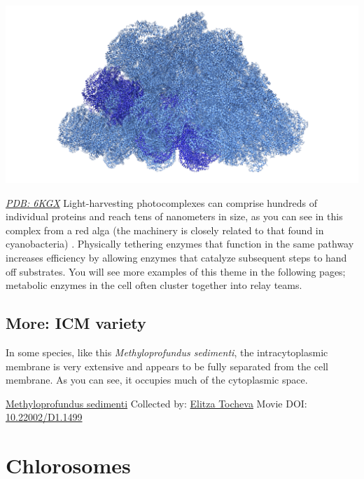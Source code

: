 \documentclass[]{tufte-book}
\begin{document}
\includegraphics{img/schematics/4_3_1}

\href{http://rcsb.org/structure/6KGX}{\emph{PDB: 6KGX}}
Light-harvesting photocomplexes can comprise hundreds of individual proteins and reach tens of nanometers in size, as you can see in this complex from a red alga (the machinery is closely related to that found in cyanobacteria) \citep{ma2020}. Physically tethering enzymes that function in the same pathway increases efficiency by allowing enzymes that catalyze subsequent steps to hand off substrates. You will see more examples of this theme in the following pages; metabolic enzymes in the cell often cluster together into relay teams.

\hypertarget{ICM_variety}{%
\subsection*{More: ICM variety}\label{ICM_variety}}

In some species, like this \emph{Methyloprofundus sedimenti}, the intracytoplasmic membrane is very extensive and appears to be fully separated from the cell membrane. As you can see, it occupies much of the cytoplasmic space.



\hypertarget{htmlwidget-bf174f9710ed93cc4305}{}

\label{fig:4-3a}\protect\hyperlink{tree}{Methyloprofundus sedimenti} Collected by: \protect\hyperlink{elitza_tocheva}{Elitza Tocheva} Movie DOI: \href{https://doi.org/10.22002/D1.1499}{10.22002/D1.1499}

\hypertarget{chlorosomes}{%
\section{Chlorosomes}\label{chlorosomes}}
\end{document}
